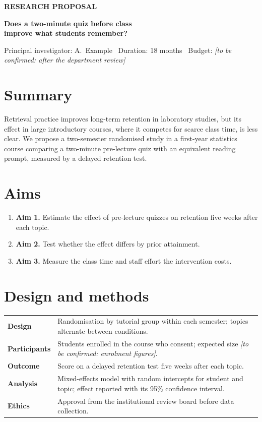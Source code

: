 \documentclass[11pt,a4paper]{scrartcl}
\newcommand{\tbc}[1]{{\color{Accent}\itshape [to be confirmed: #1]}}
\begin{document}
{\small\sffamily\bfseries\color{Muted}RESEARCH PROPOSAL\par}
\vspace{.2\baselineskip}
{\fontsize{22}{26}\selectfont\sffamily\bfseries Does a two-minute quiz before class\\ improve what students remember?\par}
\vspace{.4\baselineskip}
{\color{Muted}Principal investigator: A.\ Example \textperiodcentered\ Duration: 18 months \textperiodcentered\ Budget: \tbc{after the department review}\par}

\section{Summary}
Retrieval practice improves long-term retention in laboratory studies, but its effect in large
introductory courses, where it competes for scarce class time, is less clear. We propose a
two-semester randomised study in a first-year statistics course comparing a two-minute
pre-lecture quiz with an equivalent reading prompt, measured by a delayed retention test.

\section{Aims}
\begin{enumerate}[leftmargin=1.4em]
  \item \textbf{Aim 1.} Estimate the effect of pre-lecture quizzes on retention five weeks after each topic.
  \item \textbf{Aim 2.} Test whether the effect differs by prior attainment.
  \item \textbf{Aim 3.} Measure the class time and staff effort the intervention costs.
\end{enumerate}

\section{Design and methods}
\begin{tabularx}{\linewidth}{@{}>{\sffamily\bfseries}p{.2\linewidth}X@{}}
Design & Randomisation by tutorial group within each semester; topics alternate between conditions. \\\addlinespace
Participants & Students enrolled in the course who consent; expected size \tbc{enrolment figures}. \\\addlinespace
Outcome & Score on a delayed retention test five weeks after each topic. \\\addlinespace
Analysis & Mixed-effects model with random intercepts for student and topic; effect reported with its 95\% confidence interval. \\\addlinespace
Ethics & Approval from the institutional review board before data collection. \\
\end{tabularx}
\end{document}
